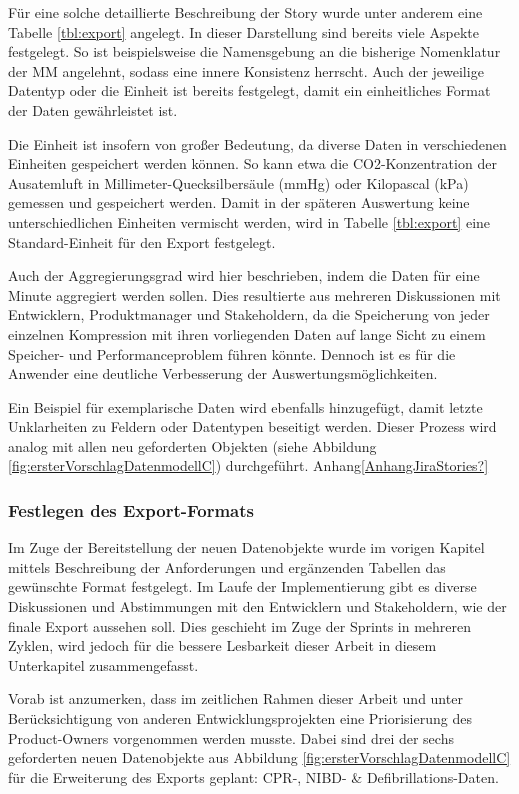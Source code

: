 Für eine solche detaillierte Beschreibung der Story wurde unter anderem eine Tabelle \ref{tbl:export} angelegt.
In dieser Darstellung sind bereits viele Aspekte festgelegt.
So ist beispielsweise die Namensgebung an die bisherige Nomenklatur der \gls{MM} angelehnt, sodass eine innere Konsistenz herrscht.
Auch der jeweilige Datentyp oder die Einheit ist bereits festgelegt, damit ein einheitliches Format der Daten gewährleistet ist.

Die Einheit ist insofern von großer Bedeutung, da diverse Daten in verschiedenen Einheiten gespeichert werden können.
So kann etwa die CO2-Konzentration der Ausatemluft in Millimeter-Quecksilbersäule (mmHg) oder Kilopascal (kPa) gemessen und gespeichert werden.
Damit in der späteren Auswertung keine unterschiedlichen Einheiten vermischt werden, wird in Tabelle \ref{tbl:export} eine Standard-Einheit für den Export festgelegt.

Auch der Aggregierungsgrad wird hier beschrieben, indem die Daten für eine Minute aggregiert werden sollen.
Dies resultierte aus mehreren Diskussionen mit Entwicklern, Produktmanager und Stakeholdern, da die Speicherung von jeder einzelnen Kompression mit ihren vorliegenden Daten auf lange Sicht zu einem Speicher- und Performanceproblem führen könnte.
Dennoch ist es für die Anwender eine deutliche Verbesserung der Auswertungsmöglichkeiten.

Ein Beispiel für exemplarische Daten wird ebenfalls hinzugefügt, damit letzte Unklarheiten zu Feldern oder Datentypen beseitigt werden.
Dieser Prozess wird analog mit allen neu geforderten Objekten (siehe Abbildung \ref{fig:ersterVorschlagDatenmodellC}) durchgeführt. Anhang\ref{AnhangJiraStories?}

\subsubsection{Festlegen des Export-Formats}
Im Zuge der Bereitstellung der neuen Datenobjekte wurde im vorigen Kapitel mittels Beschreibung der Anforderungen und ergänzenden Tabellen das gewünschte Format festgelegt.
Im Laufe der Implementierung gibt es diverse Diskussionen und Abstimmungen mit den Entwicklern und Stakeholdern, wie der finale Export aussehen soll.
Dies geschieht im Zuge der \glqq Sprints\grqq{} in mehreren Zyklen, wird jedoch für die bessere Lesbarkeit dieser Arbeit in diesem Unterkapitel zusammengefasst.

Vorab ist anzumerken, dass im zeitlichen Rahmen dieser Arbeit und unter Berücksichtigung von anderen Entwicklungsprojekten eine Priorisierung des Product-Owners vorgenommen werden musste.
Dabei sind drei der sechs geforderten neuen Datenobjekte aus Abbildung \ref{fig:ersterVorschlagDatenmodellC} für die Erweiterung des Exports  geplant: \gls{CPR}-, \gls{NIBD}- \& Defibrillations-Daten.

